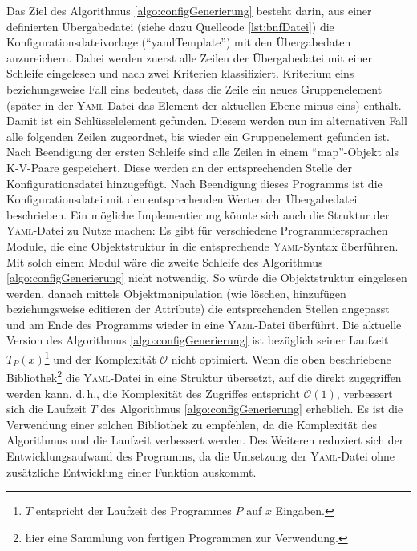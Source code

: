 Das Ziel des Algorithmus \vref{algo:configGenerierung} besteht darin, aus einer definierten Übergabedatei (siehe dazu Quellcode \vref{lst:bnfDatei}) die Konfigurationsdateivorlage (\enquote{yamlTemplate}) mit den Übergabedaten anzureichern. Dabei werden zuerst alle Zeilen der Übergabedatei mit einer Schleife eingelesen und nach zwei Kriterien klassifiziert. Kriterium eins beziehungsweise Fall eins bedeutet, dass die Zeile ein neues Gruppenelement (später in der \textsc{Yaml}-Datei das Element der aktuellen Ebene minus eins) enthält. Damit ist ein Schlüsselelement gefunden. Diesem werden nun im alternativen Fall alle folgenden Zeilen zugeordnet, bis wieder ein Gruppenelement gefunden ist. Nach Beendigung der ersten Schleife sind alle Zeilen in einem \enquote{map}-Objekt als \ac{K-V}-Paare gespeichert. Diese werden an der entsprechenden Stelle der Konfigurationsdatei hinzugefügt. Nach Beendigung dieses Programms ist die Konfigurationsdatei mit den entsprechenden Werten der Übergabedatei beschrieben. 
Ein mögliche Implementierung könnte sich auch die Struktur der \textsc{Yaml}-Datei zu Nutze machen: Es gibt für verschiedene Programmiersprachen Module, die eine Objektstruktur in die entsprechende \textsc{Yaml}-Syntax überführen. Mit solch einem Modul wäre die zweite Schleife des Algorithmus \ref{algo:configGenerierung} nicht notwendig. So würde die Objektstruktur eingelesen werden, danach mittels Objektmanipulation (wie löschen, hinzufügen beziehungsweise editieren der Attribute) die entsprechenden Stellen angepasst und am Ende des Programms wieder in eine \textsc{Yaml}-Datei überführt. Die aktuelle Version des Algorithmus \ref{algo:configGenerierung} ist bezüglich seiner Laufzeit $T_{P}(x)$\footnote{$T$ entspricht der Laufzeit des Programmes $P$ auf $x$ Eingaben.} und der Komplexität $\mathcal{O}$ nicht optimiert. Wenn die oben beschriebene Bibliothek\footnote{hier eine Sammlung von fertigen Programmen zur Verwendung.} die \textsc{Yaml}-Datei in eine Struktur übersetzt, auf die direkt zugegriffen werden kann, d.\,h., die Komplexität des Zugriffes entspricht $\mathcal{O}(1)$, verbessert sich die Laufzeit $T$ des Algorithmus \vref{algo:configGenerierung} erheblich. Es ist die Verwendung einer solchen Bibliothek zu empfehlen, da die Komplexität des Algorithmus und die Laufzeit verbessert werden. Des Weiteren reduziert sich der Entwicklungsaufwand des Programms, da die Umsetzung der \textsc{Yaml}-Datei ohne zusätzliche Entwicklung einer Funktion auskommt.

